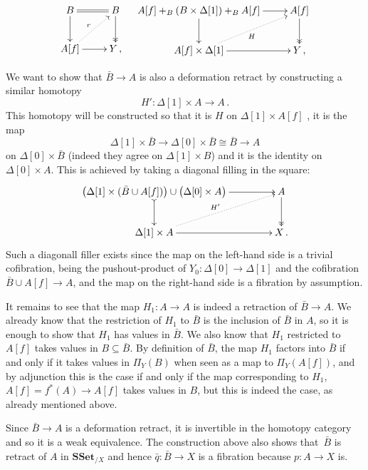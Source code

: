 \documentclass[reqno,10pt,a4paper,oneside]{amsart}
\makeatletter
\renewenvironment{proof}[1][\proofname] {\par\pushQED{\qed}\normalfont\topsep6\p@\@plus6\p@\relax\trivlist\item[\hskip\labelsep\bf#1\@addpunct{.}]\ignorespaces}{\popQED\endtrivlist\@endpefalse}
\numberwithin{equation}{section}
\theoremstyle{mythm}
\theoremstyle{mydef}
\theoremstyle{myrmk}
\newcommand{\co}{\colon}
\newcommand{\iso}{\cong}
\newcommand{\SSet}{\mathbf{SSet}}
\makeatother
\begin{document}
\begin{proof}
\[\xymatrix{
B \ar[d] \ar@{=}[r]  & B \ar@{->>}[d] \\
A[f] \ar[r] \ar@{.>}[ur]^r  & Y \, , 
} \quad \xymatrix{
\displaystyle A[f] +_B \left( B \times \Delta[1] \right) +_B A[f] \ar[d] \ar[r]  & A[f] \ar@{->>}[d] \\
A[f] \times \Delta[1] \ar[r] \ar@{.>}[ur]_H  & Y \, , 
}\]

We want to show that $\bar{B} \rightarrow A$ is also a deformation retract by constructing a similar homotopy 
\[
H' \co \Delta[1] \times A \rightarrow A \, .
\] 
This homotopy will be constructed so that it is $H$ on $\Delta[1] \times A[f]$ ,  it is the map 
\[
\Delta[1] \times \bar{B} \rightarrow \Delta[0]  \times \bar{B} \iso \bar{B} \rightarrow A
\] 
on $\Delta[0] \times \bar{B} $ (indeed they agree on $\Delta[1] \times B$) and it is the identity on $\Delta[0] \times A$.  This is achieved by taking a diagonal filling in the square:
\[
\xymatrix@C=1.5cm{
\big( \Delta[1] \times (\bar{B} \cup A[f]) \big)  \cup \big( \Delta[0] \times A \big) \ar@{>->}[d] \ar[r] & A \ar@{->>}[d] \\
\Delta[1] \times A \ar[r] \ar@{.>}[ur]^{H'} & X \, .
}\]
Such a diagonall filler exists since the map on the left-hand side is a trivial cofibration, being the 
 pushout-product of $Y_0 \co \Delta[0] \rightarrow \Delta[1]$ and the cofibration $\bar{B} \cup A[f] \rightarrow A$, and the map on the right-hand side is a fibration by assumption.

It remains to see that the map $H_{1} \co A \rightarrow A$ is indeed a retraction of $\bar{B} \rightarrow A$. We already know that the restriction of $H_{1}$ to $\bar{B}$ is  the inclusion of $\bar{B}$ in $A$, so it is enough to show that $H_{1}$ has values in $\bar{B}$. We also know that $H_{1}$ restricted to $A[f]$ takes values in $B \subseteq \bar{B}$. By definition of $\bar{B}$, the map $H_1$ factors into $\bar{B}$ if and only if it takes values in $\Pi_Y(B)$ when seen as a map to $\Pi_Y(A[f])$, and by adjunction this is the case if and only if the map corresponding to $H_1$, $A[f]= f^*(A) \rightarrow A[f]$ takes values in $B$, but this is indeed the case, as already mentioned above.

Since $\bar{B} \rightarrow A$ is a deformation retract, it is invertible in the homotopy category and so it is a weak equivalence. The construction above also shows that~$\bar{B}$ is retract of $A$ in $\SSet_{/X}$ and hence $\bar{q} \co \bar{B} \rightarrow X$ is a fibration because $p \co A \rightarrow X$ is.
\end{proof}
\end{document}
